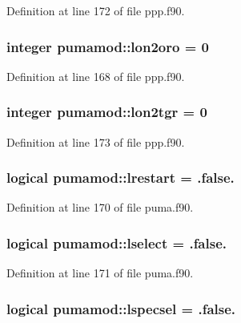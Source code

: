 \-Definition at line 172 of file ppp.\-f90.

\hypertarget{classpumamod_a5acbb0c115c64b84b8b1b25ad84f30aa}{
\subsubsection[{lon2oro}]{\setlength{\rightskip}{0pt plus 5cm}integer {\bf pumamod\-::lon2oro} = 0}}
\label{classpumamod_a5acbb0c115c64b84b8b1b25ad84f30aa}


\-Definition at line 168 of file ppp.\-f90.

\hypertarget{classpumamod_a76c8a5bcafbc5b01c5d6c9732a5cdcf1}{
\subsubsection[{lon2tgr}]{\setlength{\rightskip}{0pt plus 5cm}integer {\bf pumamod\-::lon2tgr} = 0}}
\label{classpumamod_a76c8a5bcafbc5b01c5d6c9732a5cdcf1}


\-Definition at line 173 of file ppp.\-f90.

\hypertarget{classpumamod_ac3cfb3fcdded6ec157594b899e3ea6f8}{
\subsubsection[{lrestart}]{\setlength{\rightskip}{0pt plus 5cm}logical {\bf pumamod\-::lrestart} = .false.}}
\label{classpumamod_ac3cfb3fcdded6ec157594b899e3ea6f8}


\-Definition at line 170 of file puma.\-f90.

\hypertarget{classpumamod_aea52fae2a0b29f7669124cb727b07a5f}{
\subsubsection[{lselect}]{\setlength{\rightskip}{0pt plus 5cm}logical {\bf pumamod\-::lselect} = .false.}}
\label{classpumamod_aea52fae2a0b29f7669124cb727b07a5f}


\-Definition at line 171 of file puma.\-f90.

\hypertarget{classpumamod_ae1611527d39b509b932ec189dd6885c3}{
\subsubsection[{lspecsel}]{\setlength{\rightskip}{0pt plus 5cm}logical {\bf pumamod\-::lspecsel} = .false.}}
\label{classpumamod_ae1611527d39b509b932ec189dd6885c3}


